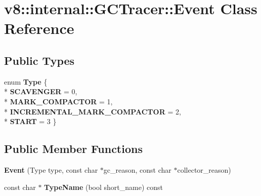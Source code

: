 \hypertarget{classv8_1_1internal_1_1_g_c_tracer_1_1_event}{}\section{v8\+:\+:internal\+:\+:G\+C\+Tracer\+:\+:Event Class Reference}
\label{classv8_1_1internal_1_1_g_c_tracer_1_1_event}
\subsection*{Public Types}
\begin{DoxyCompactItemize}
\item 
enum {\bfseries Type} \{ \\*
{\bfseries S\+C\+A\+V\+E\+N\+G\+ER} = 0, 
\\*
{\bfseries M\+A\+R\+K\+\_\+\+C\+O\+M\+P\+A\+C\+T\+OR} = 1, 
\\*
{\bfseries I\+N\+C\+R\+E\+M\+E\+N\+T\+A\+L\+\_\+\+M\+A\+R\+K\+\_\+\+C\+O\+M\+P\+A\+C\+T\+OR} = 2, 
\\*
{\bfseries S\+T\+A\+RT} = 3
 \}\hypertarget{classv8_1_1internal_1_1_g_c_tracer_1_1_event_a0f3b1f2a3d83c7041662d371f94ac3f4}{}\label{classv8_1_1internal_1_1_g_c_tracer_1_1_event_a0f3b1f2a3d83c7041662d371f94ac3f4}

\end{DoxyCompactItemize}
\subsection*{Public Member Functions}
\begin{DoxyCompactItemize}
\item 
{\bfseries Event} (Type type, const char $\ast$gc\+\_\+reason, const char $\ast$collector\+\_\+reason)\hypertarget{classv8_1_1internal_1_1_g_c_tracer_1_1_event_abfc808d5b6ae9dbb4aa3d05b889b1c7d}{}\label{classv8_1_1internal_1_1_g_c_tracer_1_1_event_abfc808d5b6ae9dbb4aa3d05b889b1c7d}

\item 
const char $\ast$ {\bfseries Type\+Name} (bool short\+\_\+name) const \hypertarget{classv8_1_1internal_1_1_g_c_tracer_1_1_event_a6ce96cd39411592c945e602a6a33d742}{}\label{classv8_1_1internal_1_1_g_c_tracer_1_1_event_a6ce96cd39411592c945e602a6a33d742}

\end{DoxyCompactItemize}
